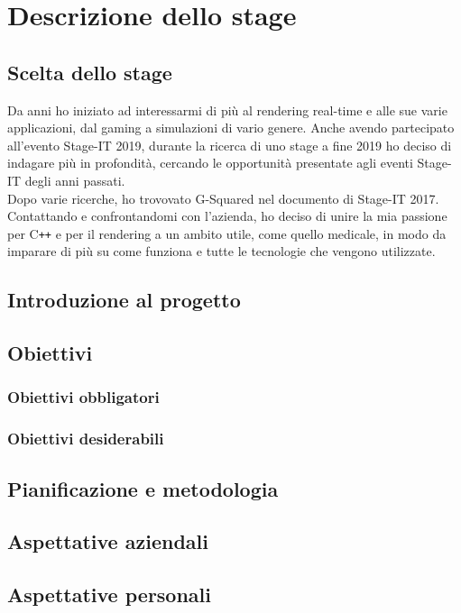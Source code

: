 
\chapter{Descrizione dello stage}
\label{cap:descrizione-stage}

\section{Scelta dello stage}
Da anni ho iniziato ad interessarmi di più al rendering real-time e alle sue varie applicazioni, dal gaming a simulazioni di vario genere.
Anche avendo partecipato all'evento Stage-IT 2019, durante la ricerca di uno stage a fine 2019 ho deciso di indagare più in profondità, cercando le opportunità presentate agli eventi Stage-IT degli anni passati. \\
Dopo varie ricerche, ho trovovato G-Squared nel documento di Stage-IT 2017. Contattando e confrontandomi con l'azienda, ho deciso di unire la mia passione per C\texttt{++} e per il rendering a un ambito utile, come quello medicale, in modo da imparare di più su come funziona e tutte le tecnologie che vengono utilizzate.

\section{Introduzione al progetto}

\section{Obiettivi}
\subsection{Obiettivi obbligatori}\label{sec:obiettivi-obbligatori}

\subsection{Obiettivi desiderabili}\label{sec:obiettivi-desiderabili}

\section{Pianificazione e metodologia}

\section{Aspettative aziendali}


\section{Aspettative personali}